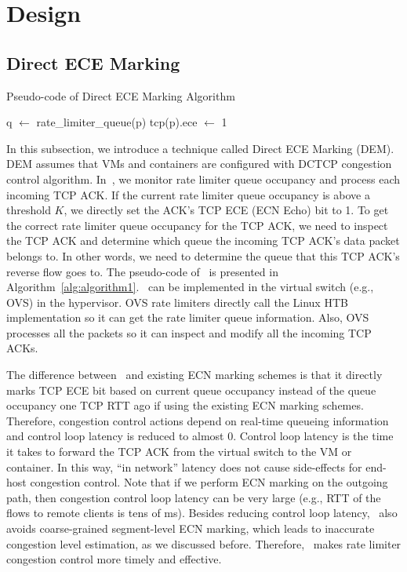 \section{Design}
\label{rate-limiter:sec:design}

\subsection{Direct ECE Marking}
\begin{algorithm}[!t]
\caption{Pseudo-code of Direct ECE Marking Algorithm}
\label{alg:algorithm1}
\begin{algorithmic}[1]
\STATE q $\leftarrow$ rate\_limiter\_queue(p)
\STATE tcp(p).ece $\leftarrow$ 1
\ENDIF
\ENDFOR
\end{algorithmic}
\end{algorithm}

In this subsection, we introduce a technique called Direct ECE Marking (DEM). 
DEM assumes that VMs and containers are configured with DCTCP congestion control algorithm. 
In~\dem{}, we monitor rate limiter queue occupancy and process each incoming TCP ACK. 
If the current rate limiter queue occupancy is above a threshold $K$, 
we directly set the ACK's TCP ECE (ECN Echo) bit to 1.
To get the correct rate limiter queue occupancy for the TCP ACK, we need to inspect the TCP ACK and
determine which queue the incoming TCP ACK's data packet belongs to. In other words, we need to 
determine the queue that this TCP ACK's reverse flow goes to.
The pseudo-code of~\dem{} is presented in Algorithm~\ref{alg:algorithm1}.~\dem{} can be
implemented in the virtual switch (e.g., OVS) in the hypervisor. OVS rate limiters directly call
the Linux HTB implementation so it can get the rate limiter queue information. Also, OVS processes all the packets
so it can inspect and modify all the incoming TCP ACKs. 

The difference between~\dem{} 
and existing ECN marking schemes is that it directly marks TCP ECE bit based on 
current queue occupancy instead of the queue occupancy one TCP RTT ago if using the existing ECN marking schemes.
Therefore, congestion control actions depend on real-time queueing information and control loop latency 
is reduced to almost 0. Control loop latency is the time it takes to forward the TCP ACK from the 
virtual switch to the VM or container. In this way, ``in network'' latency does not cause 
side-effects for end-host congestion control. Note that if we perform ECN marking on the outgoing path, then 
congestion control loop latency can be very large (e.g., RTT of the flows to remote clients is tens of ms).
Besides reducing control loop latency,~\dem{} also avoids coarse-grained segment-level ECN marking, 
which leads to inaccurate congestion level estimation, as we discussed before.
Therefore,~\dem{} makes rate limiter congestion control more timely and effective.


